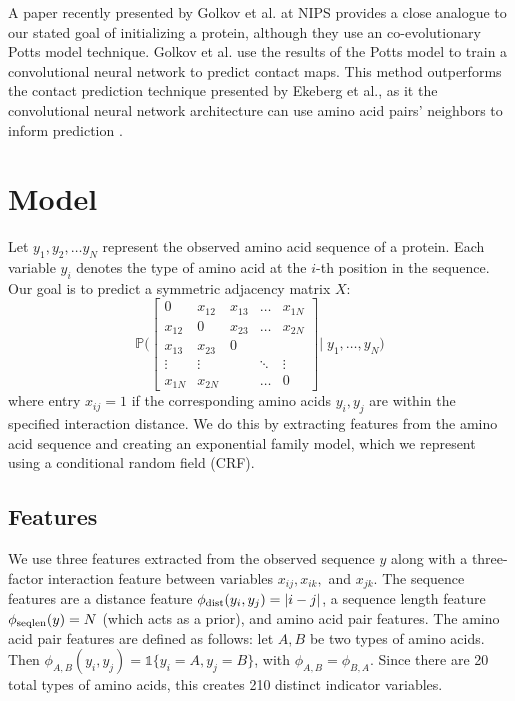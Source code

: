 \documentclass{article}
\begin{document}
A paper recently presented by Golkov et al. at NIPS provides a close analogue to our stated goal of initializing a protein, although they use an co-evolutionary Potts model technique. Golkov et al. use the results of the Potts model to train a convolutional neural network to predict contact maps. This method outperforms the contact prediction technique presented by Ekeberg et al., as it the convolutional neural network architecture can use amino acid pairs' neighbors to inform prediction \cite{golkov16}. 


\section{Model}
Let $y_1, y_2, \ldots y_N$ represent the observed amino acid sequence of a protein. Each variable $y_i$ denotes the type of amino acid at the $i$-th position in the sequence. Our goal is to predict a symmetric adjacency matrix $X$:
\begin{equation} \label{eq:adjmatrix}
\mathbb{P}\Bigg(
\begin{bmatrix} 
0         & x_{12} & x_{13} & \dots   & x_{1N} \\
x_{12} & 0         & x_{23} & \dots   & x_{2N} \\
x_{13} & x_{23} & 0         &            &             \\
\vdots & \vdots  &            & \ddots & \vdots   \\
x_{1N} & x_{2N} &          & \dots    & 0
\end{bmatrix}
\Bigg| \; y_1, \ldots, y_N\Bigg) 
\end{equation}
where entry $x_{ij} = 1$ if the corresponding amino acids $y_i, y_j$ are within the specified interaction distance. We do this by extracting features from the amino acid sequence and creating an exponential family model, which we represent using a conditional random field (CRF). 

\subsection{Features}
We use three features extracted from the observed sequence $y$ along with a three-factor interaction feature between variables $x_{ij}, x_{ik},$ and $x_{jk}$. The sequence features are a distance feature $\phi_{\textmd{dist}}(y_i, y_j) = |i - j|$, a sequence length feature $\phi_{\textmd{seqlen}}(y) = N$ (which acts as a prior), and amino acid pair features. The amino acid pair features are defined as follows: let $A, B$ be two types of amino acids. Then $\phi_{A, B}(y_i, y_j) = \mathds{1}\{y_i = A, y_j = B\}$, with $\phi_{A, B} = \phi_{B, A}$. Since there are 20 total types of amino acids, this creates 210 distinct indicator variables.
\end{document}
